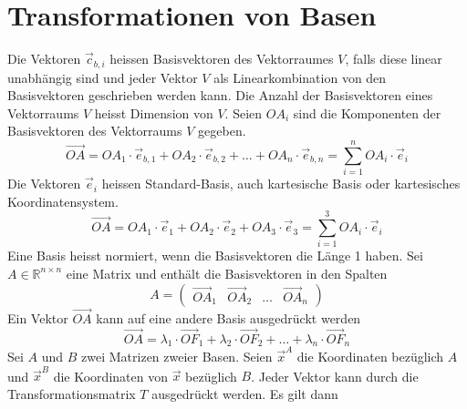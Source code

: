 \section{Transformationen von Basen}
Die Vektoren $\overrightarrow{c}_{b,i}$ heissen Basisvektoren des Vektorraumes $V$, falls diese linear unabhängig sind und jeder Vektor $V$ als Linearkombination von den Basisvektoren geschrieben werden kann.
\newline\newline
Die Anzahl der Basisvektoren eines Vektorraums $V$ heisst Dimension von $V$.
\newline\newline
Seien $OA_i$ sind die Komponenten der Basisvektoren des Vektorraums $V$ gegeben.
\begin{equation}
\boxed{\overrightarrow{OA}=OA_1\cdot \overrightarrow{e}_{b,1}+OA_2\cdot \overrightarrow{e}_{b,2}+\dotso+OA_n\cdot \overrightarrow{e}_{b,n}=\displaystyle \sum_{i=1}^nOA_i\cdot \overrightarrow{e}_i}
\end{equation}
Die Vektoren $\overrightarrow{e}_i$ heissen Standard-Basis, auch kartesische Basis oder kartesisches Koordinatensystem.
\begin{equation}
\boxed{\overrightarrow{OA}=OA_1\cdot \overrightarrow{e}_1+OA_2\cdot \overrightarrow{e}_2+OA_3\cdot \overrightarrow{e}_3=\displaystyle \sum_{i=1}^3OA_i\cdot \overrightarrow{e}_i}
\end{equation}
Eine Basis heisst normiert, wenn die Basisvektoren die Länge 1 haben.
\newline\newline
Sei $A\in\mathbb{R}^{n\times n}$ eine Matrix und enthält die Basisvektoren in den Spalten
\begin{equation}
\boxed{A=\begin{pmatrix}\overrightarrow{OA}_1&\overrightarrow{OA}_2&\dotso&\overrightarrow{OA}_n\end{pmatrix}}
\end{equation}
Ein Vektor $\overrightarrow{OA}$ kann auf eine andere Basis ausgedrückt werden
\begin{equation}
\boxed{\overrightarrow{OA}=\lambda_1\cdot \overrightarrow{OF}_1+\lambda_2\cdot \overrightarrow{OF}_2+\dotso+\lambda_n\cdot \overrightarrow{OF}_n}
\end{equation}
Sei $A$ und $B$ zwei Matrizen zweier Basen. Seien $\overrightarrow{x}^A$ die Koordinaten bezüglich $A$ und $\overrightarrow{x}^B$ die Koordinaten von $\overrightarrow{x}$ bezüglich $B$. Jeder Vektor kann durch die Transformationsmatrix $T$ ausgedrückt werden. Es gilt dann
